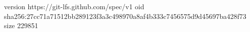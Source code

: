 version https://git-lfs.github.com/spec/v1
oid sha256:27cc71a71512bb289123f3a3c498970a8af4b333c7456575d9d45697ba428f73
size 229851
